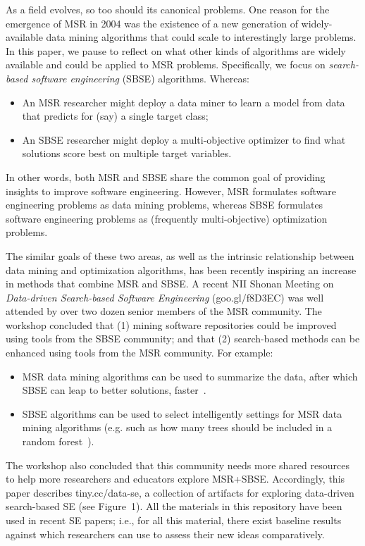 \documentclass[sigconf]{acmart}
\begin{document}
As a field evolves, so too should its canonical problems. One reason for the emergence of   MSR  in 2004 was the existence of a new generation of widely-available data mining algorithms that could scale to interestingly large problems. In this paper, we pause to reflect on what other kinds of algorithms are widely available and could be applied to MSR problems.  Specifically, we focus on
{\em search-based software engineering} (SBSE) algorithms. Whereas:
\begin{itemize}[leftmargin=*]
\item
An MSR researcher might deploy a
data miner to learn a model from  data   that predicts for (say) a single target class;
\item
An SBSE researcher might deploy a multi-objective optimizer
to find what {solutions} score best
on multiple target variables.
\end{itemize}

{In other words, both MSR and SBSE share the common goal of providing insights to improve software engineering. However, MSR formulates software engineering problems as data mining problems, whereas SBSE formulates software engineering problems as (frequently multi-objective) optimization problems.}


{The similar goals of these two areas, as well as the intrinsic relationship between data mining and optimization algorithms, has been recently inspiring an} increase in methods that combine MSR and SBSE.
A recent {NII Shonan Meeting}  on {\em Data-driven Search-based Software
Engineering} (goo.gl/f8D3EC)   was well attended by over two dozen senior members of the MSR community.
The workshop concluded that (1) mining software repositories could be improved using {tools from the SBSE community}; and that (2) search-based methods can be enhanced using tools from the MSR community. 
For example:
\begin{itemize}[leftmargin=*]
\item
MSR data mining algorithms can be used to summarize the data, after which SBSE can leap to better solutions, faster~\cite{krall2015gale}.
\item
SBSE {algorithms} can be used to select intelligently 
settings for MSR data mining algorithms (e.g.
such as how many trees should be included in a random
forest~\cite{fu2016tuning}).
\end{itemize}
The workshop also concluded that this community needs more shared resources to help more researchers and educators explore MSR+SBSE.
Accordingly, this paper describes  tiny.cc/data-se,
a collection of artifacts for exploring
data-driven search-based SE (see Figure~1). 
All the materials in this repository
have been used in recent SE papers; i.e., for all this material, there exist baseline results against which researchers can use to assess their new ideas comparatively.
\end{document}
